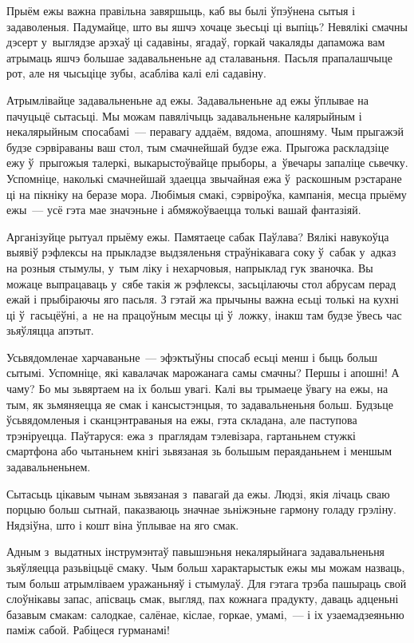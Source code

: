 Прыём ежы важна правільна завяршыць, каб вы былі ўпэўнена сытыя і задаволеныя. Падумайце, што вы яшчэ хочаце зьесьці ці выпіць? Невялікі смачны дэсерт у~выглядзе арэхаў ці садавіны, ягадаў, горкай чакаляды дапаможа вам атрымаць яшчэ большае задавальненьне ад сталаваньня. Пасьля прапалашчыце рот, але ня чысьціце зубы, асабліва калі елі садавіну.

Атрымлівайце задавальненьне ад ежы. Задавальненьне ад ежы ўплывае на пачуцьцё сытасьці. Мы можам павялічыць задавальненьне калярыйным і некалярыйным спосабамі~--- перавагу аддаём, вядома, апошняму. Чым прыгажэй будзе сэрвіраваны ваш стол, тым смачнейшай будзе ежа. Прыгожа раскладзіце ежу ў~прыгожыя талеркі, выкарыстоўвайце прыборы, а~ўвечары запаліце сьвечку. Успомніце, наколькі смачнейшай здаецца звычайная ежа ў~раскошным рэстаране ці на пікніку на беразе мора. Любімыя смакі, сэрвіроўка, кампанія, месца прыёму ежы~--- усё гэта мае значэньне і абмяжоўваецца толькі вашай фантазіяй.

Арганізуйце рытуал прыёму ежы. Памятаеце сабак Паўлава? Вялікі навукоўца выявіў рэфлексы на прыкладзе выдзяленьня страўнікавага соку ў~сабак у~адказ на розныя стымулы, у~тым ліку і нехарчовыя, напрыклад гук званочка. Вы можаце выпрацаваць у~сябе такія ж рэфлексы, засьцілаючы стол абрусам перад ежай і прыбіраючы яго пасьля. З гэтай жа прычыны важна есьці толькі на кухні ці ў~гасьцёўні, а~не на працоўным месцы ці ў~ложку, інакш там будзе ўвесь час зьяўляцца апэтыт.

Усьвядомленае харчаваньне~--- эфэктыўны спосаб есьці менш і быць больш сытымі. Успомніце, які кавалачак марожанага самы смачны? Першы і апошні! А чаму? Бо мы зьвяртаем на іх больш увагі. Калі вы трымаеце ўвагу на ежы, на тым, як зьмяняецца яе смак і кансыстэнцыя, то задавальненьня больш. Будзьце ўсьвядомленыя і сканцэнтраваныя на ежы, гэта складана, але паступова трэніруецца. Паўтаруся: ежа з~праглядам тэлевізара, гартаньнем стужкі смартфона або чытаньнем кнігі зьвязаная зь большым пераяданьнем і меншым задавальненьнем.

Сытасьць цікавым чынам зьвязаная з~павагай да ежы. Людзі, якія лічаць сваю порцыю больш сытнай, паказваюць значнае зьніжэньне гармону голаду грэліну. Нядзіўна, што і кошт віна ўплывае на яго смак.

Адным з~выдатных інструмэнтаў павышэньня некалярыйнага задавальненьня зьяўляецца разьвіцьцё смаку. Чым больш характарыстык ежы мы можам назваць, тым больш атрымліваем уражаньняў і стымулаў. Для гэтага трэба пашыраць свой слоўнікавы запас, апісваць смак, выгляд, пах кожнага прадукту, даваць адценьні базавым смакам: салодкае, салёнае, кіслае, горкае, умамі,~--- і іх узаемадзеяньню паміж сабой. Рабіцеся гурманамі!

